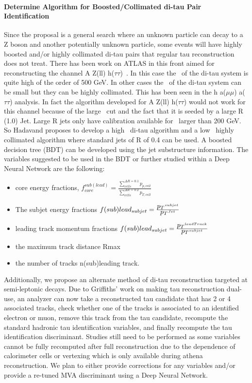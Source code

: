 \paragraph{Determine Algorithm for Boosted/Collimated di-tau Pair Identification} %
Since the proposal is a general search where an unknown particle can decay to a Z boson and another potentially unknown particle, some events will have highly boosted and/or highly collimated di-tau pairs that regular
tau reconstruction does not treat.  There has been work on ATLAS in this front aimed for reconstructing the channel A \too Z(ll) h($\tau\tau$)~\cite{di-tau-thesis}.  In this case the \pt\ of the di-tau system is quite high of the order of 500 GeV.
In other cases the \pt\ of the di-tau system can be small but they can be highly collimated.  This has been seen in the h \too a($\mu \mu$) a($\tau \tau$) analysis.  In fact the algorithm developed for A \too Z(ll) h($\tau\tau$) would not 
work for this channel because of the large \pt\ cut and the fact that it is seeded by a large R (1.0) Jet.  Large R jets only have calibration available for \pt\ larger than 200 GeV.  So Hadavand proposes to develop a high \pt\ di-tau
algorithm and a low \pt\ highly collimated algorithm where standard jets of R of 0.4 can be used. A boosted decision tree (BDT) can be developed using the jet substructure information.  
The variables suggested to be used in the BDT or further studied within a Deep Neural Network are the following:
\begin{itemize}
\item{core energy fractions, $f_{core}^{sub(lead)}=\frac{\sum_{cells}^{\Delta R=0.1} p_{p,cell}}{\sum_{cells}^{\Delta R=0.2}p_{T,cell}} $}
\item{The subjet energy fractions $f(sub)lead_{subjet}=\frac{\mbox{$p_T$} ^{subjet}}{\mbox{$p_T$} ^{Jet}}$}
\item{leading track momentum fractions $f(sub)lead_{subjet}=\frac{\mbox{$p_T$} ^{leadTrack}}{\mbox{$p_T$} ^{subjet}}$}
\item{the maximum track distance Rmax}
\item{the number of tracks n(sub)leading track.}
\end{itemize}
Additionally, we propose an alternate method of di-tau reconstruction targeted at semi-leptonic decays.  Due to Griffiths' work on making tau reconstruction dual-use, an analyzer
can now take a reconstructed tau candidate that has 2 or 4 associated tracks, check whether one of the tracks is associated to an identified electron or muon, remove this
track from the tau candidate, recompute the standard hadronic tau identification variables, and finally recompute the tau identification discriminant.  Studies still need
to be performed as some variables cannot be fully recomputed after full reconstruction due to the dependence of calorimeter cells or vertexing which is only available during 
athena reconstruction.  We plan to either provide corrections for any variables and/or provide a re-tuned MVA discriminant using a Deep Neural Network.

